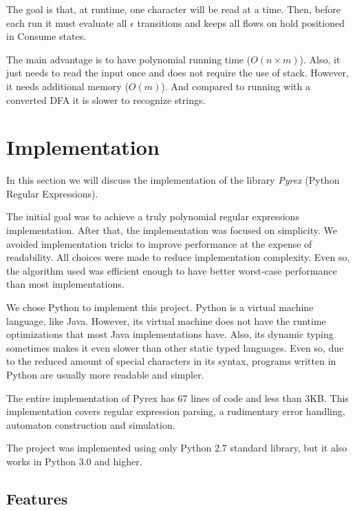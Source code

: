 \documentclass{llncs}
\begin{document}
The goal is that, at runtime, one character will be read at a time. Then, before each run it must evaluate all $\epsilon$ transitions and keeps all flows on hold positioned in {\sc Consume} states.

The main advantage is to have polynomial running time ($O(n \times m)$). Also, it just needs to read the input once and does not require the use of stack. However, it needs additional memory ($O(m)$). And compared to running with a converted DFA it is slower to recognize strings.

\section{Implementation}\label{cap:implementation}

In this section we will discuss the implementation of the library \emph{Pyrex} (Python Regular Expressions).

The initial goal was to achieve a truly polynomial regular expressions implementation. After that, the implementation was focused on simplicity. We avoided implementation tricks to improve performance at the expense of readability. All choices were made to reduce implementation complexity. Even so, the algorithm used was efficient enough to have better worst-case performance than most implementations.

We chose Python to implement this project. Python is a virtual machine language, like Java. However, its virtual machine does not have the runtime optimizations that most Java implementations have. Also, its dynamic typing sometimes makes it even slower than other static typed languages. Even so, due to the reduced amount of special characters in its syntax, programs written in Python are usually more readable and simpler. 

The entire implementation of Pyrex has 67 lines of code and less than 3KB. This implementation covers regular expression parsing, a rudimentary error handling, automaton construction and simulation.

The project was implemented using only Python 2.7 standard library, but it also works in Python 3.0 and higher.

\subsection{Features}
\end{document}
